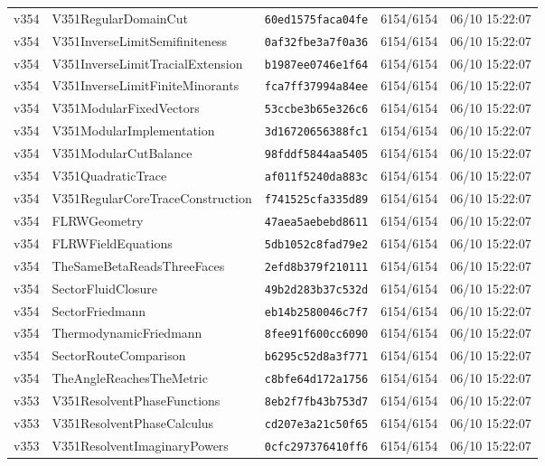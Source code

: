 \documentclass[11pt]{article}
\theoremstyle{definition}\newtheorem{deriv}{Derivação}
\begin{document}
{\begin{longtable}{@{}lllll@{}}
v354 & V351RegularDomainCut & \texttt{60ed1575faca04fe} & 6154/6154 & 06/10 15:22:07 \\
v354 & V351InverseLimitSemifiniteness & \texttt{0af32fbe3a7f0a36} & 6154/6154 & 06/10 15:22:07 \\
v354 & V351InverseLimitTracialExtension & \texttt{b1987ee0746e1f64} & 6154/6154 & 06/10 15:22:07 \\
v354 & V351InverseLimitFiniteMinorants & \texttt{fca7ff37994a84ee} & 6154/6154 & 06/10 15:22:07 \\
v354 & V351ModularFixedVectors & \texttt{53ccbe3b65e326c6} & 6154/6154 & 06/10 15:22:07 \\
v354 & V351ModularImplementation & \texttt{3d16720656388fc1} & 6154/6154 & 06/10 15:22:07 \\
v354 & V351ModularCutBalance & \texttt{98fddf5844aa5405} & 6154/6154 & 06/10 15:22:07 \\
v354 & V351QuadraticTrace & \texttt{af011f5240da883c} & 6154/6154 & 06/10 15:22:07 \\
v354 & V351RegularCoreTraceConstruction & \texttt{f741525cfa335d89} & 6154/6154 & 06/10 15:22:07 \\
v354 & FLRWGeometry & \texttt{47aea5aebebd8611} & 6154/6154 & 06/10 15:22:07 \\
v354 & FLRWFieldEquations & \texttt{5db1052c8fad79e2} & 6154/6154 & 06/10 15:22:07 \\
v354 & TheSameBetaReadsThreeFaces & \texttt{2efd8b379f210111} & 6154/6154 & 06/10 15:22:07 \\
v354 & SectorFluidClosure & \texttt{49b2d283b37c532d} & 6154/6154 & 06/10 15:22:07 \\
v354 & SectorFriedmann & \texttt{eb14b2580046c7f7} & 6154/6154 & 06/10 15:22:07 \\
v354 & ThermodynamicFriedmann & \texttt{8fee91f600cc6090} & 6154/6154 & 06/10 15:22:07 \\
v354 & SectorRouteComparison & \texttt{b6295c52d8a3f771} & 6154/6154 & 06/10 15:22:07 \\
v354 & TheAngleReachesTheMetric & \texttt{c8bfe64d172a1756} & 6154/6154 & 06/10 15:22:07 \\
v353 & V351ResolventPhaseFunctions & \texttt{8eb2f7fb43b753d7} & 6154/6154 & 06/10 15:22:07 \\
v353 & V351ResolventPhaseCalculus & \texttt{cd207e3a21c50f65} & 6154/6154 & 06/10 15:22:07 \\
v353 & V351ResolventImaginaryPowers & \texttt{0cfc297376410ff6} & 6154/6154 & 06/10 15:22:07 \\

\end{longtable}}
\end{document}

